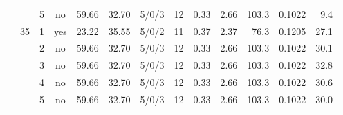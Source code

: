 \begin{table}[h]
\begin{tabular}{lrrcrrcrrrrrr}
 &  & 5 & no & 59.66 & 32.70 & 5/0/3 & 12 & 0.33 & 2.66 & 103.3 & 0.1022 & 9.4 \\
\cmidrule(lr){2-13}
 & 35 & 1 & yes & 23.22 & 35.55 & 5/0/2 & 11 & 0.37 & 2.37 & 76.3 & 0.1205 & 27.1 \\
 &  & 2 & no & 59.66 & 32.70 & 5/0/3 & 12 & 0.33 & 2.66 & 103.3 & 0.1022 & 30.1 \\
 &  & 3 & no & 59.66 & 32.70 & 5/0/3 & 12 & 0.33 & 2.66 & 103.3 & 0.1022 & 32.8 \\
 &  & 4 & no & 59.66 & 32.70 & 5/0/3 & 12 & 0.33 & 2.66 & 103.3 & 0.1022 & 30.6 \\
 &  & 5 & no & 59.66 & 32.70 & 5/0/3 & 12 & 0.33 & 2.66 & 103.3 & 0.1022 & 30.0 \\
\bottomrule
\end{tabular}
\end{table}

